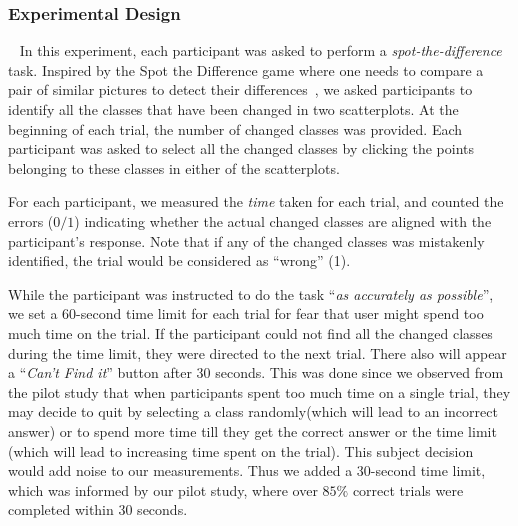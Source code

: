 \subsubsection{Experimental Design}
\
\newline
\vspace{.3em}
In this experiment, each participant was asked to perform a \emph{spot-the-difference} task. Inspired by the Spot the Difference game where one needs to compare a pair of similar pictures to detect their differences~\cite{Fukuba2009}, we asked participants to identify all the classes that have been changed in two scatterplots. At the beginning of each trial, the number of changed classes was provided. Each participant was asked to select all the changed classes by clicking the points belonging to these classes in either of the scatterplots.

For each participant, we measured the \emph{time} taken for each trial, and counted the errors ($0/1$) indicating whether the actual changed classes are aligned with the participant's response. Note that if any of the changed classes was mistakenly identified, the trial would be considered as ``wrong'' (1).

While the participant was instructed to do the task ``\emph{as accurately as possible}'', we set a $60$-second time limit for each trial for fear that user might spend too much time on the trial. If the participant could not find all the changed classes during the time limit, they were directed to the next trial. There also will appear a ``\emph{Can't Find it}'' button after $30$ seconds.
This was done since we observed from the pilot study that when participants spent too much time on a single trial, they may decide to quit by selecting a class randomly(which will lead to an incorrect answer) or to spend more time till they get the correct answer or the time limit (which will lead to increasing time spent on the trial). This subject decision would add noise to our measurements. Thus we added a $30$-second time limit, which was informed by our pilot study, where over $85\%$ correct trials were completed within $30$ seconds.

